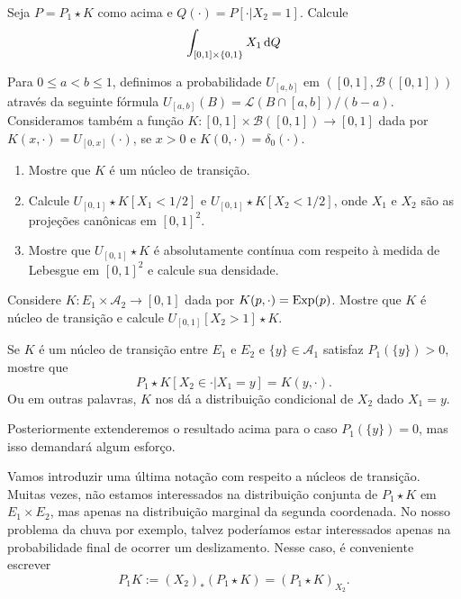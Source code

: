 \begin{exercise}
  Seja $P = P_1 \star K$ como acima e $Q(\cdot) = P[\cdot | X_2 = 1]$.
  Calcule
  \begin{equation}
    \int_{[0,1] \times \{0,1\}} X_1 \mathop{}\!\mathrm{d} Q
  \end{equation}
\end{exercise}

\begin{exercise}
  Para $0 \leq a < b \leq 1$, definimos a probabilidade $U_{[a,b]}$ em $([0,1], \mathcal{B}([0,1]))$ através da seguinte fórmula $U_{[a,b]}(B) = \mathcal{L}(B \cap [a,b])/(b-a)$.
  Consideramos também a função $K:[0,1] \times \mathcal{B}([0,1]) \to [0,1]$ dada por $K(x, \cdot) = U_{[0,x]} (\cdot)$, se $x > 0$ e $K(0, \cdot) = \delta_0(\cdot)$.
  \begin{enumerate}[\quad a)]
  \item Mostre que $K$ é um núcleo de transição.
  \item Calcule $U_{[0,1]} \star K [X_1 < 1/2]$ e $U_{[0,1]} \star K [X_2 < 1/2]$, onde $X_1$ e $X_2$ são as projeções canônicas em $[0,1]^2$.
  \item Mostre que $U_{[0,1]} \star K$ é absolutamente contínua com respeito à medida de Lebesgue em $[0,1]^2$ e calcule sua densidade.
\end{enumerate}

\end{exercise}

\begin{exercise}
  Considere $K:E_1 \times \mathcal{A}_2 \to [0,1]$ dada por $K(p, \cdot) = \operatorname{Exp}(p)$.
  Mostre que $K$ é núcleo de transição e calcule $U_{[0,1]}[X_2 > 1] \star K$.
\end{exercise}

\begin{exercise}
  Se $K$ é um núcleo de transição entre $E_1$ e $E_2$ e $\{y\} \in \mathcal{A}_1$ satisfaz $P_1(\{y\}) > 0$, mostre que
  \begin{equation}
    P_1 \star K [X_2 \in \cdot | X_1 = y] = K(y, \cdot).
  \end{equation}
  Ou em outras palavras, $K$ nos dá a distribuição condicional de $X_2$ dado $X_1 = y$.
\end{exercise}

Posteriormente extenderemos o resultado acima para o caso $P_1(\{y\}) = 0$, mas isso demandará algum esforço.

Vamos introduzir uma última notação com respeito a núcleos de transição.
Muitas vezes, não estamos interessados na distribuição conjunta de $P_1 \star K$ em $E_1 \times E_2$, mas apenas na distribuição marginal da segunda coordenada.
No nosso problema da chuva por exemplo, talvez poderíamos estar interessados apenas na probabilidade final de ocorrer um deslizamento.
Nesse caso, é conveniente escrever
\begin{equation}
  \label{e:P1_K}
  P_1 K := (X_2)_*(P_1 \star K) = (P_1 \star K)_{X_2}.
\end{equation}

